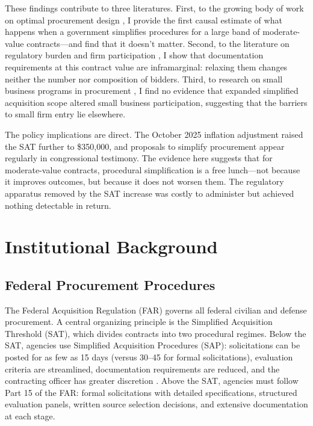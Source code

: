\documentclass[12pt]{article}
\begin{document}
These findings contribute to three literatures. First, to the growing body of work on optimal procurement design \citep{bosio2022, bajari2014, tadelis2012}, I provide the first causal estimate of what happens when a government simplifies procedures for a large band of moderate-value contracts---and find that it doesn't matter. Second, to the literature on regulatory burden and firm participation \citep{bandiera2009, krasnokutskaya2011, marion2007}, I show that documentation requirements at this contract value are inframarginal: relaxing them changes neither the number nor composition of bidders. Third, to research on small business programs in procurement \citep{athey2013, liebman2018}, I find no evidence that expanded simplified acquisition scope altered small business participation, suggesting that the barriers to small firm entry lie elsewhere.

The policy implications are direct. The October 2025 inflation adjustment raised the SAT further to \$350,000, and proposals to simplify procurement appear regularly in congressional testimony. The evidence here suggests that for moderate-value contracts, procedural simplification is a free lunch---not because it improves outcomes, but because it does not worsen them. The regulatory apparatus removed by the SAT increase was costly to administer but achieved nothing detectable in return.

\section{Institutional Background}

\subsection{Federal Procurement Procedures}

The Federal Acquisition Regulation (FAR) governs all federal civilian and defense procurement. A central organizing principle is the Simplified Acquisition Threshold (SAT), which divides contracts into two procedural regimes. Below the SAT, agencies use Simplified Acquisition Procedures (SAP): solicitations can be posted for as few as 15 days (versus 30--45 for formal solicitations), evaluation criteria are streamlined, documentation requirements are reduced, and the contracting officer has greater discretion \citep{kelman2005}. Above the SAT, agencies must follow Part 15 of the FAR: formal solicitations with detailed specifications, structured evaluation panels, written source selection decisions, and extensive documentation at each stage.
\end{document}
